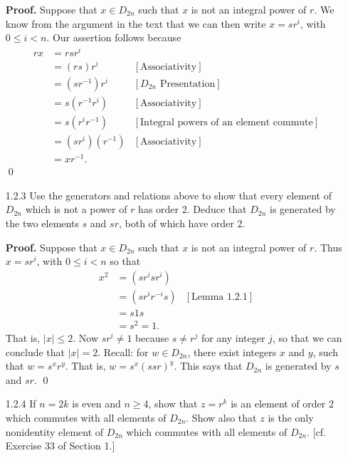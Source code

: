\begin{enumerate}
      \textbf{Proof.} Suppose that $x \in D_{2n}$ such that $x$ is not an
      integral power of $r$. We know from the argument in the text that we can
      then write $x = sr^i$, with $0 \le i < n$. Our assertion follows
      because
      \begin{align*}
         rx &= rsr^i \\
            &= (rs)r^i &[\text{Associativity}] \\
            &= (sr^{-1})r^i &[D_{2n}\text{ Presentation}] \\
            &= s(r^{-1}r^i) &[\text{Associativity}] \\
            &= s(r^ir^{-1}) &[\text{Integral powers of an element commute}] \\
            &= (sr^i)(r^{-1}) &[\text{Associativity}] \\
            &= xr^{-1}.
      \end{align*}
      \qed
   \item[1.2.3]   Use the generators and relations above to show that every
                  element of $D_{2n}$ which is not a power of $r$ has order 2.
                  Deduce that $D_{2n}$ is generated by the two elements $s$ and
                  $sr$, both of which have order 2.
                  
      \textbf{Proof.} Suppose that $x \in D_{2n}$ such that $x$ is not an
      integral power of $r$. Thus $x = sr^i$, with $0 \le i < n$ so that
      \begin{align*}
         x^2 &= (sr^isr^i) \\
             &= (sr^ir^{-i}s) &[\text{Lemma 1.2.1}] \\
             &= s1s \\
             &= s^2 = 1.
      \end{align*}
      That is, $|x| \le 2$. Now $sr^i \neq 1$ because $s \neq r^j$ for any
      integer $j$, so that we can conclude that $|x| = 2$. Recall: for
      $w \in D_{2n}$, there exist integers $x$ and $y$, such that $w = s^xr^y$.
      That is, $w = s^x(ssr)^y$. This says that $D_{2n}$ is generated by $s$ and
      $sr$. \qed
   \item[1.2.4]   If $n = 2k$ is even and $n \ge 4$, show that $z = r^k$ is an
                  element of order 2 which commutes with all elements of
                  $D_{2n}$. Show also that $z$ is the only nonidentity element
                  of $D_{2n}$ which commutes with all elements of $D_{2n}$. [cf.
                  Exercise 33 of Section 1.]
                  

\end{enumerate}
